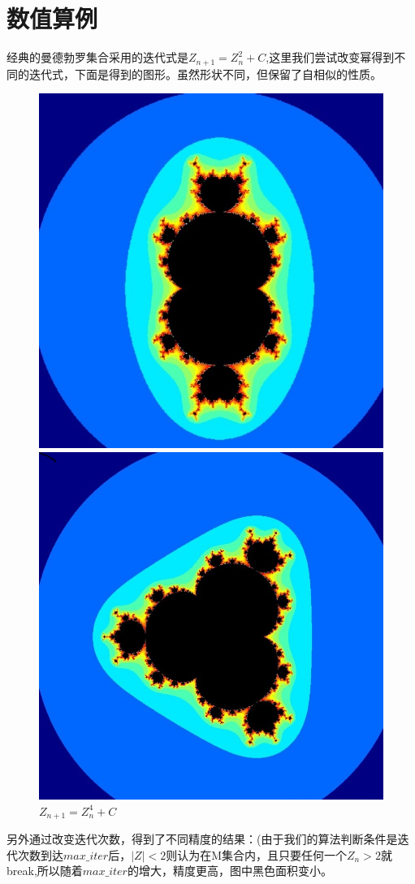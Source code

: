 \documentclass{ctexart}
\begin{document}
\newpage
\section{数值算例}
经典的曼德勃罗集合采用的迭代式是$Z_{n+1}=Z_n^2+C$,这里我们尝试改变幂得到不同的迭代式，下面是得到的图形。虽然形状不同，但保留了自相似的性质。

\begin{figure}[htbp]
	\centering
	\begin{minipage}{0.4\linewidth}
		\centering
		\includegraphics[width=0.52\linewidth]{1.jpg}	
		\caption{$Z_{n+1}=Z_n^3+C$}
		\label{chutian1}%
	\end{minipage}
	\begin{minipage}{0.52\linewidth}
		\centering
		\includegraphics[width=0.42\linewidth]{2.jpg}
		\caption{$Z_{n+1}=Z_n^4+C$}
		\label{chutian2}%
	\end{minipage}
\end{figure}
另外通过改变迭代次数，得到了不同精度的结果：(由于我们的算法判断条件是迭代次数到达$max\_iter$后，$|Z|<2$则认为在M集合内，且只要任何一个$Z_n>2$就break,所以随着$max\_iter$的增大，精度更高，图中黑色面积变小。
\end{document}
